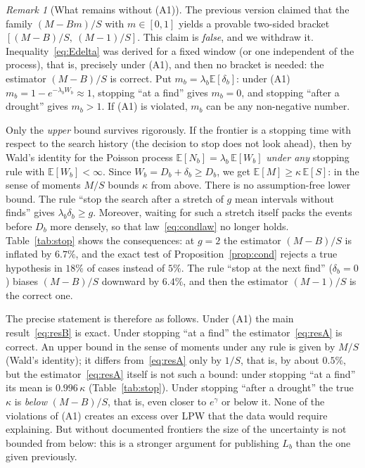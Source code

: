 \documentclass[11pt,a4paper]{article}
\theoremstyle{plain}
\theoremstyle{remark}
\newtheorem{remark}{Remark}
\newcommand{\eg}{e^{\gamma}}
\begin{document}
\begin{remark}[What remains without (A1)]\label{rem:bracket}
The previous version claimed that the family $(M-Bm)/S$ with $m\in[0,1]$ yields a
provable two-sided bracket $[(M-B)/S,\ (M-1)/S]$. This claim is \emph{false},
and we withdraw it. Inequality~\eqref{eq:Edelta} was derived for a fixed window
(or one independent of the process), that is, precisely under (A1), and then no
bracket is needed: the estimator $(M-B)/S$ is correct. Put
$m_b=\lambda_b\mathbb E[\delta_b]$: under (A1) $m_b=1-e^{-\lambda_bW_b}\approx1$,
stopping ``at a find'' gives $m_b=0$, and stopping ``after a drought'' gives
$m_b>1$. If (A1) is violated, $m_b$ can be any non-negative number.

Only the \emph{upper} bound survives rigorously. If the frontier is a stopping
time with respect to the search history (the decision to stop does not look
ahead), then by Wald's identity for the Poisson process
$\mathbb E[N_b]=\lambda_b\,\mathbb E[W_b]$ \emph{under any} stopping rule with
$\mathbb E[W_b]<\infty$. Since $W_b=D_b+\delta_b\ge D_b$, we get
$\mathbb E[M]\ge\kappa\,\mathbb E[S]$: in the sense of moments $M/S$ bounds
$\kappa$ from above. There is no assumption-free lower bound. The rule ``stop
the search after a stretch of $g$ mean intervals without finds'' gives
$\lambda_b\delta_b\ge g$. Moreover, waiting for such a stretch itself packs the
events before $D_b$ more densely, so that law~\eqref{eq:condlaw} no longer holds.
Table~\ref{tab:stop} shows the consequences: at $g=2$ the estimator $(M-B)/S$ is
inflated by $6.7\%$, and the exact test of Proposition~\ref{prop:cond} rejects a
true hypothesis in $18\%$ of cases instead of $5\%$. The rule ``stop at the next
find'' ($\delta_b=0$) biases $(M-B)/S$ downward by $6.4\%$, and then the
estimator $(M-1)/S$ is the correct one.

The precise statement is therefore as follows. Under (A1) the main
result~\eqref{eq:resB} is exact. Under stopping ``at a find'' the
estimator~\eqref{eq:resA} is correct. An upper bound in the sense of moments
under any rule is given by $M/S$ (Wald's identity); it differs
from~\eqref{eq:resA} only by $1/S$, that is, by about $0.5\%$, but the
estimator~\eqref{eq:resA} itself is not such a bound: under stopping ``at a
find'' its mean is $0.996\,\kappa$ (Table~\ref{tab:stop}). Under stopping
``after a drought'' the true
$\kappa$ is \emph{below} $(M-B)/S$, that is, even closer to $\eg$ or below it.
None of the violations of (A1) creates an excess over LPW that the data would
require explaining. But without documented frontiers the size of the
uncertainty is not bounded from below: this is a stronger argument for
publishing $L_b$ than the one given previously.


\end{remark}
\end{document}
